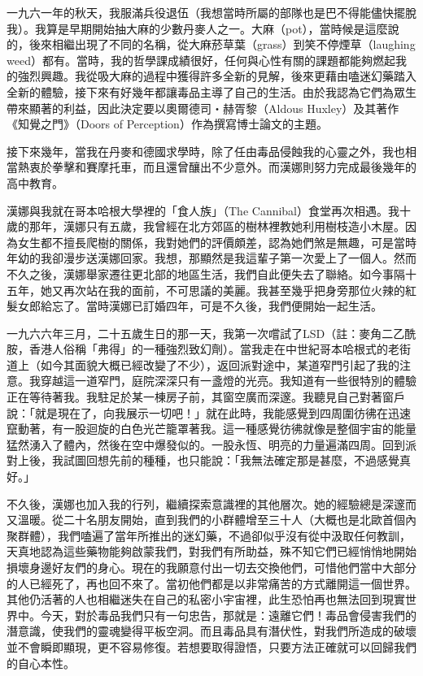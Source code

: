 一九六一年的秋天，我服滿兵役退伍（我想當時所屬的部隊也是巴不得能儘快擺脫我）。我算是早期開始抽大麻的少數丹麥人之一。大麻（pot），當時候是這麼說的，後來相繼出現了不同的名稱，從大麻菸草葉（grass）到笑不停煙草（laughing
weed）都有。當時，我的哲學課成績很好，任何與心性有關的課題都能夠燃起我的強烈興趣。我從吸大麻的過程中獲得許多全新的見解，後來更藉由嗑迷幻藥踏入全新的體驗，接下來有好幾年都讓毒品主導了自己的生活。由於我認為它們為眾生帶來顯著的利益，因此決定要以奧爾德司‧赫胥黎（Aldous
Huxley）及其著作《知覺之門》（Doors of
Perception）作為撰寫博士論文的主題。

接下來幾年，當我在丹麥和德國求學時，除了任由毒品侵蝕我的心靈之外，我也相當熱衷於拳擊和賽摩托車，而且還曾釀出不少意外。而漢娜則努力完成最後幾年的高中教育。

漢娜與我就在哥本哈根大學裡的「食人族」（The
Cannibal）食堂再次相遇。我十歲的那年，漢娜只有五歲，我曾經在北方郊區的樹林裡教她利用樹枝造小木屋。因為女生都不擅長爬樹的關係，我對她們的評價頗差，認為她們煞是無趣，可是當時年幼的我卻漫步送漢娜回家。我想，那顯然是我這輩子第一次愛上了一個人。然而不久之後，漢娜舉家遷往更北部的地區生活，我們自此便失去了聯絡。如今事隔十五年，她又再次站在我的面前，不可思議的美麗。我甚至幾乎把身旁那位火辣的紅髮女郎給忘了。當時漢娜已訂婚四年，可是不久後，我們便開始一起生活。

一九六六年三月，二十五歲生日的那一天，我第一次嚐試了LSD（註：麥角二乙酰胺，香港人俗稱「弗得」的一種強烈致幻劑）。當我走在中世紀哥本哈根式的老街道上（如今其面貌大概已經改變了不少），返回派對途中，某道窄門引起了我的注意。我穿越這一道窄門，庭院深深只有一盞燈的光亮。我知道有一些很特別的體驗正在等待著我。我駐足於某一棟房子前，其窗空廣而深邃。我聽見自己對著窗戶說：「就是現在了，向我展示一切吧！」就在此時，我能感覺到四周圍彷彿在迅速竄動著，有一股迴旋的白色光芒籠罩著我。這一種感覺彷彿就像是整個宇宙的能量猛然湧入了體內，然後在空中爆發似的。一股永恆、明亮的力量遍滿四周。回到派對上後，我試圖回想先前的種種，也只能說：「我無法確定那是甚麼，不過感覺真好。」

不久後，漢娜也加入我的行列，繼續探索意識裡的其他層次。她的經驗總是深邃而又溫暖。從二十名朋友開始，直到我們的小群體增至三十人（大概也是北歐首個內聚群體），我們嗑遍了當年所推出的迷幻藥，不過卻似乎沒有從中汲取任何教訓，天真地認為這些藥物能夠啟蒙我們，對我們有所助益，殊不知它們已經悄悄地開始損壞身邊好友們的身心。現在的我願意付出一切去交換他們，可惜他們當中大部分的人已經死了，再也回不來了。當初他們都是以非常痛苦的方式離開這一個世界。其他仍活著的人也相繼迷失在自己的私密小宇宙裡，此生恐怕再也無法回到現實世界中。今天，對於毒品我們只有一句忠告，那就是：遠離它們！毒品會侵害我們的潛意識，使我們的靈魂變得平板空洞。而且毒品具有潛伏性，對我們所造成的破壞並不會瞬即顯現，更不容易修復。若想要取得證悟，只要方法正確就可以回歸我們的自心本性。

